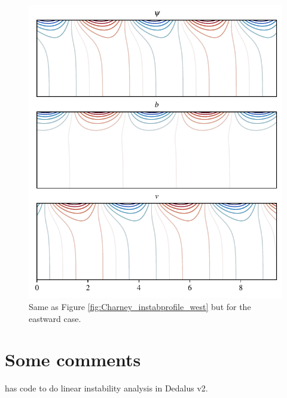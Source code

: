 \begin{figure}
    \centering
    \includegraphics{Charney_instabprofile_east}
    \caption{Same as Figure \ref{fig:Charney_instabprofile_west} but for the eastward case.}
    \label{fig:Charney_instabprofile_east}
\end{figure}

\section{Some comments}
\cite{LuoCallies_23} has code to do linear instability analysis in Dedalus v2. 